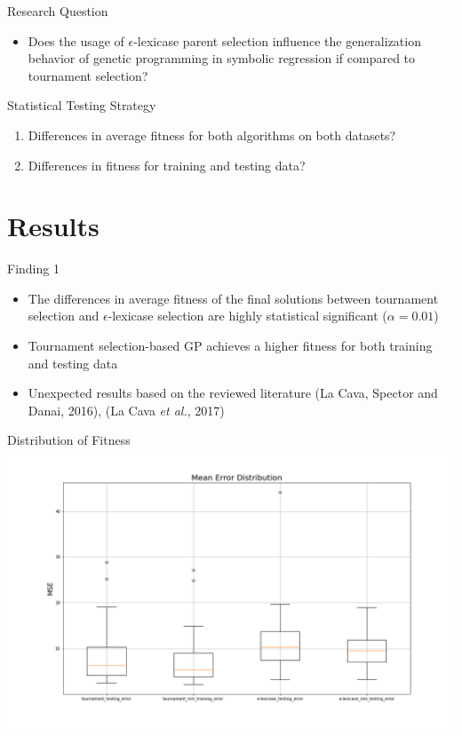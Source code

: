 \documentclass[
  ignorenonframetext,
]{beamer}
\providecommand{\tightlist}{%
  \setlength{\itemsep}{0pt}\setlength{\parskip}{0pt}}
\begin{document}
\begin{frame}{Research Question}
\protect\hypertarget{research-question-1}{}
\begin{itemize}
\tightlist
\item
  Does the usage of \(\epsilon\)-lexicase parent selection influence the
  generalization behavior of genetic programming in symbolic regression
  if compared to tournament selection?
\end{itemize}

\begin{block}{Statistical Testing Strategy}
\protect\hypertarget{statistical-testing-strategy}{}
\begin{enumerate}
\tightlist
\item
  Differences in average fitness for both algorithms on both datasets?
\item
  Differences in fitness for training and testing data?
\end{enumerate}
\end{block}
\end{frame}

\hypertarget{results}{%
\section{Results}\label{results}}

\begin{frame}{Finding 1}
\protect\hypertarget{finding-1}{}
\begin{itemize}
\tightlist
\item
  The differences in average fitness of the final solutions between
  tournament selection and \(\epsilon\)-lexicase selection are highly
  statistical significant (\(\alpha=0.01\))
\item
  Tournament selection-based GP achieves a higher fitness for both
  training and testing data
\item
  Unexpected results based on the reviewed literature (La Cava, Spector
  and Danai, 2016), (La Cava \emph{et al.}, 2017)
\end{itemize}
\end{frame}

\begin{frame}{Distribution of Fitness}
\protect\hypertarget{distribution-of-fitness}{}
\includegraphics{../plots/mean_error_boxplot_all.png}
\end{frame}
\end{document}
